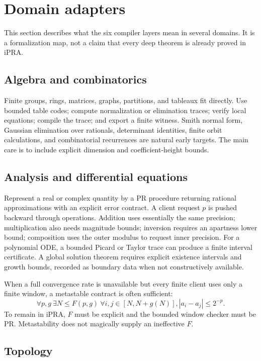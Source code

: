 \documentclass[11pt]{article}
\begin{document}
\section{Domain adapters}
\label{sec:domains}

This section describes what the six compiler layers mean in several domains.
It is a formalization map, not a claim that every deep theorem is already
proved in iPRA.

\subsection{Algebra and combinatorics}

Finite groups, rings, matrices, graphs, partitions, and tableaux fit directly.
Use bounded table codes; compute normalization or elimination traces; verify
local equations; compile the trace; and export a finite witness.  Smith normal
form, Gaussian elimination over rationals, determinant identities, finite
orbit calculations, and combinatorial recurrences are natural early targets.
The main care is to include explicit dimension and coefficient-height bounds.

\subsection{Analysis and differential equations}

Represent a real or complex quantity by a PR procedure returning rational
approximations with an explicit error contract.  A client request \(p\) is
pushed backward through operations.  Addition uses essentially the same
precision; multiplication also needs magnitude bounds; inversion requires an
apartness lower bound; composition uses the outer modulus to request inner
precision.  For a polynomial ODE, a bounded Picard or Taylor trace can produce
a finite interval certificate.  A global solution theorem requires explicit
existence intervals and growth bounds, recorded as boundary data when not
constructively available.

When a full convergence rate is unavailable but every finite client uses only
a finite window, a metastable contract is often sufficient:
\[
  \forall p,g\ \exists N\le F(p,g)\ \forall i,j\in[N,N+g(N)],
  |a_i-a_j|\le 2^{-p}.
\]
To remain in iPRA, \(F\) must be explicit and the bounded window checker must be
PR.  Metastability does not magically supply an ineffective \(F\).

\subsection{Topology}
\end{document}
